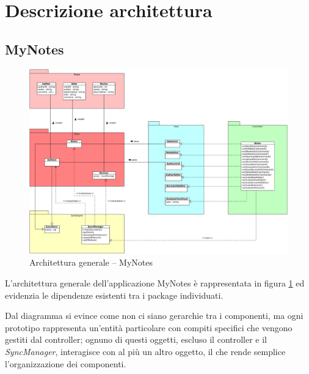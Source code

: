 \section{Descrizione architettura}
\subsection{MyNotes}
\begin{figure}[htbp]
\centering
\includegraphics[scale=0.5,angle=90]{gfx/class/MyNotes.pdf}
\caption{Architettura generale -- MyNotes}
\label{fig:architettura MyNotes}
\end{figure}

L'architettura generale dell'applicazione MyNotes è rappresentata in figura \ref{fig:architettura MyNotes} ed evidenzia le dipendenze esistenti tra i package individuati.

Dal diagramma si evince come non ci siano gerarchie tra i componenti, ma ogni prototipo rappresenta un'entità particolare con compiti specifici che vengono gestiti dal controller; ognuno di questi oggetti, escluso il controller e il \emph{SyncManager}, interagisce con al più un altro oggetto, il che rende semplice l'organizzazione dei componenti.

